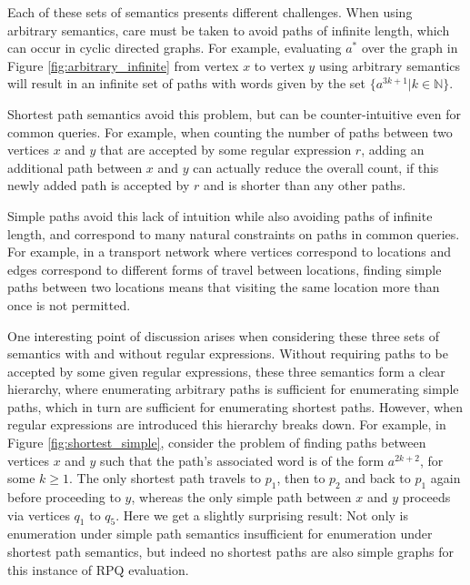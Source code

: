 \documentclass{article}
\begin{document}
Each of these sets of semantics presents different challenges. When using arbitrary semantics, care must be taken to avoid paths of infinite length, which can occur in cyclic directed graphs. For example, evaluating $a^*$ over the graph in Figure \ref{fig:arbitrary_infinite} from vertex $x$ to vertex $y$ using arbitrary semantics will result in an infinite set of paths with words given by the set $\{a^{3k+1} | k \in \mathbb{N}\}$.

Shortest path semantics avoid this problem, but can be counter-intuitive even for common queries. For example, when counting the number of paths between two vertices $x$ and $y$ that are accepted by some regular expression $r$, adding an additional path between $x$ and $y$ can actually reduce the overall count, if this newly added path is accepted by $r$ and is shorter than any other paths.

Simple paths avoid this lack of intuition while also avoiding paths of infinite length, and correspond to many natural constraints on paths in common queries. For example, in a transport network where vertices correspond to locations and edges correspond to different forms of travel between locations, finding simple paths between two locations means that visiting the same location more than once is not permitted.

One interesting point of discussion arises when considering these three sets of semantics with and without regular expressions. Without requiring paths to be accepted by some given regular expressions, these three semantics form a clear hierarchy, where enumerating arbitrary paths is sufficient for enumerating simple paths, which in turn are sufficient for enumerating shortest paths. However, when regular expressions are introduced this hierarchy breaks down. For example, in Figure \ref{fig:shortest_simple}, consider the problem of finding paths between vertices $x$ and $y$ such that the path's associated word is of the form $a^{2k+2}$, for some $k \geq 1$. The only shortest path travels to $p_1$, then to $p_2$ and back to $p_1$ again before proceeding to $y$, whereas the only simple path between $x$ and $y$ proceeds via vertices $q_1$ to $q_5$. Here we get a slightly surprising result: Not only is enumeration under simple path semantics insufficient for enumeration under shortest path semantics, but indeed no shortest paths are also simple graphs for this instance of RPQ evaluation.
\end{document}

